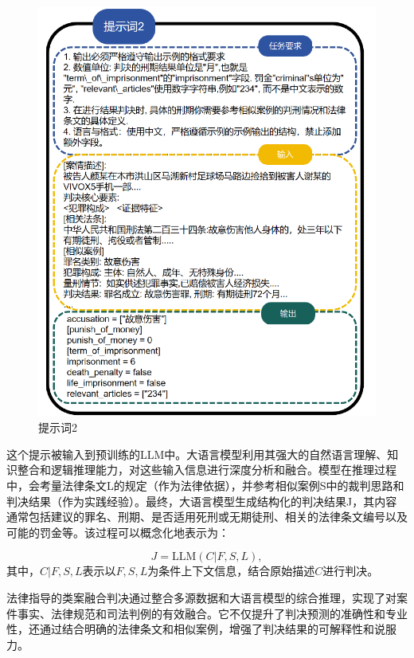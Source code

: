 \begin{figure}[H]
	\centering
	\includegraphics[width=0.8\linewidth]{fig/prompt2.pdf}
	\caption{提示词2}
	\label{fig:prompt2}
\end{figure}

这个提示被输入到预训练的LLM中。大语言模型利用其强大的自然语言理解、知识整合和逻辑推理能力，对这些输入信息进行深度分析和融合。模型在推理过程中，会考量法律条文L的规定（作为法律依据），并参考相似案例S中的裁判思路和判决结果（作为实践经验）。最终，大语言模型生成结构化的判决结果J，其内容通常包括建议的罪名、刑期、是否适用死刑或无期徒刑、相关的法律条文编号以及可能的罚金等。该过程可以概念化地表示为：

\begin{equation}
	J=\text{LLM}(C|F,S,L),
\end{equation}
其中，$C | F,S,L $表示以$F,S,L$为条件上下文信息，结合原始描述$C$进行判决。

法律指导的类案融合判决通过整合多源数据和大语言模型的综合推理，实现了对案件事实、法律规范和司法判例的有效融合。它不仅提升了判决预测的准确性和专业性，还通过结合明确的法律条文和相似案例，增强了判决结果的可解释性和说服力。